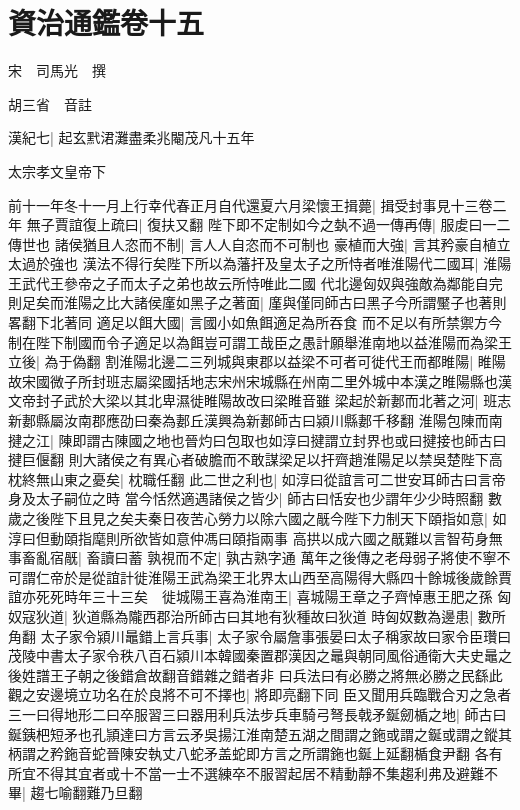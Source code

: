 \chapter{資治通鑑卷十五}
宋　司馬光　撰

胡三省　音註

漢紀七|{
	起玄黓涒灘盡柔兆閹茂凡十五年}


太宗孝文皇帝下

前十一年冬十一月上行幸代春正月自代還夏六月梁懷王揖薨|{
	揖受封事見十三卷二年}
無子賈誼復上疏曰|{
	復扶又翻}
陛下即不定制如今之埶不過一傳再傳|{
	服䖍曰一二傳世也}
諸侯猶且人恣而不制|{
	言人人自恣而不可制也}
豪植而大強|{
	言其矜豪自植立太過於強也}
漢法不得行矣陛下所以為藩扞及皇太子之所恃者唯淮陽代二國耳|{
	淮陽王武代王參帝之子而太子之弟也故云所恃唯此二國}
代北邊匈奴與強敵為鄰能自完則足矣而淮陽之比大諸侯廑如黑子之著面|{
	廑與僅同師古曰黑子今所謂黶子也著則畧翻下北著同}
適足以餌大國|{
	言國小如魚餌適足為所吞食}
而不足以有所禁禦方今制在陛下制國而令子適足以為餌豈可謂工哉臣之愚計願舉淮南地以益淮陽而為梁王立後|{
	為于偽翻}
割淮陽北邊二三列城與東郡以益梁不可者可徙代王而都睢陽|{
	睢陽故宋國微子所封班志屬梁國括地志宋州宋城縣在州南二里外城中本漢之睢陽縣也漢文帝封子武於大梁以其北卑濕徙睢陽故改曰梁睢音雖}
梁起於新郪而北著之河|{
	班志新郪縣屬汝南郡應劭曰秦為郪丘漢興為新郪師古曰潁川縣郪千移翻}
淮陽包陳而南揵之江|{
	陳即謂古陳國之地也晉灼曰包取也如淳曰揵謂立封界也或曰揵接也師古曰揵巨偃翻}
則大諸侯之有異心者破膽而不敢謀梁足以扞齊趙淮陽足以禁吳楚陛下高枕終無山東之憂矣|{
	枕職任翻}
此二世之利也|{
	如淳曰從誼言可二世安耳師古曰言帝身及太子嗣位之時}
當今恬然適遇諸侯之皆少|{
	師古曰恬安也少謂年少少時照翻}
數歲之後陛下且見之矣夫秦日夜苦心勞力以除六國之旤今陛下力制天下頤指如意|{
	如淳曰但動頤指麾則所欲皆如意仲馮曰頤指兩事}
高拱以成六國之旤難以言智苟身無事畜亂宿旤|{
	畜讀曰蓄}
孰視而不定|{
	孰古熟字通}
萬年之後傳之老母弱子將使不寧不可謂仁帝於是從誼計徙淮陽王武為梁王北界太山西至高陽得大縣四十餘城後歲餘賈誼亦死死時年三十三矣　徙城陽王喜為淮南王|{
	喜城陽王章之子齊悼惠王肥之孫}
匈奴寇狄道|{
	狄道縣為隴西郡治所師古曰其地有狄種故曰狄道}
時匈奴數為邊患|{
	數所角翻}
太子家令潁川鼂錯上言兵事|{
	太子家令屬詹事張晏曰太子稱家故曰家令臣瓚曰茂陵中書太子家令秩八百石潁川本韓國秦置郡漢因之鼂與朝同風俗通衛大夫史鼂之後姓譜王子朝之後錯倉故翻音錯雜之錯者非}
曰兵法曰有必勝之將無必勝之民繇此觀之安邊境立功名在於良將不可不擇也|{
	將即亮翻下同}
臣又聞用兵臨戰合刃之急者三一曰得地形二曰卒服習三曰器用利兵法步兵車騎弓弩長戟矛鋋劒楯之地|{
	師古曰鋋銕杷短矛也孔頴達曰方言云矛吳揚江淮南楚五湖之間謂之鉇或謂之鋋或謂之鏦其柄謂之矜鉇音蛇晉陳安執丈八蛇矛盖蛇即方言之所謂鉇也鋋上延翻楯食尹翻}
各有所宜不得其宜者或十不當一士不選練卒不服習起居不精動靜不集趨利弗及避難不畢|{
	趨七喻翻難乃旦翻}
